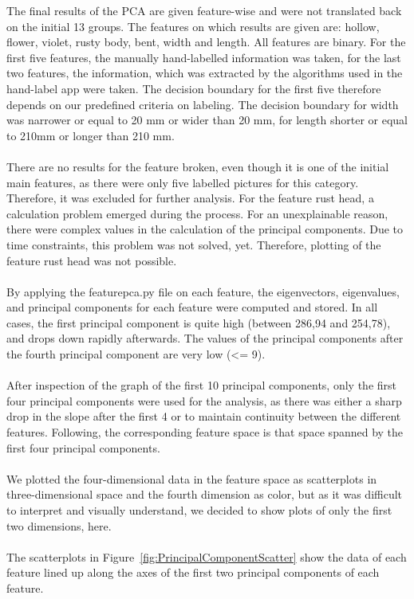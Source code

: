 The final results of the PCA are given feature-wise and were not translated back on the initial 13 groups. The features on which results are given are: hollow, flower, violet, rusty body, bent, width and length. All features are binary. For the first five features, the manually hand-labelled information was taken, for the last two features, the information, which was extracted by the algorithms used in the hand-label app were taken. The decision boundary for the first five therefore depends on our predefined criteria on labeling. The decision boundary for width was narrower or equal to 20 mm or wider than 20 mm, for length shorter or equal to 210mm or longer than 210 mm.  \\
\\
There are no results for the feature broken, even though it is one of the initial main features, as there were only five labelled pictures for this category. Therefore, it was excluded for further analysis. For the feature rust head, a calculation problem emerged during the process. For an unexplainable reason, there were complex values in the calculation of the principal components. Due to time constraints, this problem was not solved, yet. Therefore, plotting of the feature rust head was not possible.  \\
\\
By applying the feature\textunderscore pca.py file on each feature, the eigenvectors, eigenvalues, and principal components for each feature were computed and stored. In all cases, the first principal component is quite high (between 286,94 and 254,78), and drops down rapidly afterwards. The values of the principal components after the fourth principal component are very low (<= 9).  \\
\\
After inspection of the graph of the first 10 principal components,  only the  first four principal components were used for the analysis, as there was either a sharp drop in the slope after the first 4 or to maintain continuity between the different features. Following, the corresponding feature space is that space spanned by the first four principal components.  \\
 \\
We plotted the four-dimensional data in the feature space as scatterplots in three-dimensional space and the fourth dimension as color, but as it was difficult to interpret and visually understand, we decided to show plots of only the first two dimensions, here. \\ 
\\ 
The scatterplots in Figure~\ref{fig:PrincipalComponentScatter} show the data of each feature lined up along the axes of the first two principal components of each feature. \\

